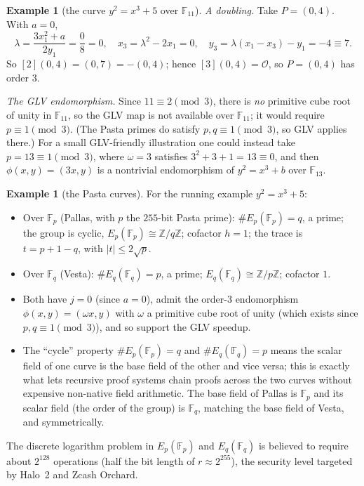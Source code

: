 \documentclass[11pt,a4paper]{article}
\theoremstyle{definition}
\newtheorem{example}[theorem]{Example}
\theoremstyle{remark}
\newcommand{\Z}{\ensuremath{\mathbb{Z}}}
\newcommand{\F}{\ensuremath{\mathbb{F}}}
\newcommand{\Fp}{\ensuremath{\mathbb{F}_{p}}}
\newcommand{\Fq}{\ensuremath{\mathbb{F}_{q}}}
\begin{document}
\begin{example}[the curve \(y^2 = x^3 + 5\) over \(\F_{11}\)]
\smallskip
\emph{A doubling.} Take \(P = (0, 4)\). With \(a = 0\),
\[
  \lambda = \frac{3 x_1^2 + a}{2 y_1} = \frac{0}{8} = 0, \quad
  x_3 = \lambda^2 - 2 x_1 = 0, \quad
  y_3 = \lambda(x_1 - x_3) - y_1 = -4 \equiv 7 .
\]
So \([2](0,4) = (0, 7) = -(0,4)\); hence \([3](0,4) = \mathcal{O}\), so \(P = (0,4)\) has order \(3\).

\smallskip
\emph{The GLV endomorphism.} Since \(11 \equiv 2 \pmod 3\), there is \emph{no} primitive cube root of unity in \(\F_{11}\), so the GLV map is not available over \(\F_{11}\); it would require \(p \equiv 1 \pmod 3\). (The Pasta primes do satisfy \(p, q \equiv 1 \pmod 3\), so GLV applies there.) For a small GLV-friendly illustration one could instead take \(p = 13 \equiv 1 \pmod 3\), where \(\omega = 3\) satisfies \(3^2 + 3 + 1 = 13 \equiv 0\), and then \(\phi(x,y) = (3x, y)\) is a nontrivial endomorphism of \(y^2 = x^3 + b\) over \(\F_{13}\).
\end{example}

\begin{example}[the Pasta curves]\label{ellipticcurves:exa-pasta}
For the running example \(y^2 = x^3 + 5\):
\begin{itemize}
  \item Over \(\Fp\) (Pallas, with \(p\) the \(255\)-bit Pasta prime): \(\#E_p(\Fp) = q\), a prime; the group is cyclic, \(E_p(\Fp) \cong \Z/q\Z\); cofactor \(h = 1\); the trace is \(t = p + 1 - q\), with \(|t| \le 2\sqrt p\).
  \item Over \(\Fq\) (Vesta): \(\#E_q(\Fq) = p\), a prime; \(E_q(\Fq) \cong \Z/p\Z\); cofactor \(1\).
  \item Both have \(j = 0\) (since \(a = 0\)), admit the order-\(3\) endomorphism \(\phi(x,y) = (\omega x, y)\) with \(\omega\) a primitive cube root of unity (which exists since \(p, q \equiv 1 \pmod 3\)), and so support the GLV speedup.
  \item The ``cycle'' property \(\#E_p(\Fp) = q\) and \(\#E_q(\Fq) = p\) means the scalar field of one curve is the base field of the other and vice versa; this is exactly what lets recursive proof systems chain proofs across the two curves without expensive non-native field arithmetic. The base field of Pallas is \(\Fp\) and its scalar field (the order of the group) is \(\Fq\), matching the base field of Vesta, and symmetrically.
\end{itemize}
The discrete logarithm problem in \(E_p(\Fp)\) and \(E_q(\Fq)\) is believed to require about \(2^{128}\) operations (half the bit length of \(r \approx 2^{255}\)), the security level targeted by Halo~2 and Zcash Orchard.
\end{example}
\end{document}
